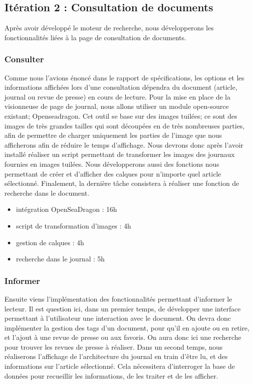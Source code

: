 \subsection{Itération 2 : Consultation de documents}
\label{subsec:consultation}

	Après avoir développé le moteur de recherche, nous développerons les fonctionnalités liées à la page de consultation de documents.

	\subsubsection{Consulter}
	\label{subsubsec:consulter}
		Comme nous l'avions énoncé dans le rapport de spécifications, les options et les informations affichées lors d'une consultation dépendra du document (article, journal ou revue de presse) en cours de lecture.
		Pour la mise en place de la visionneuse de page de journal, nous allons utiliser un module open-source existant; Openseadragon. Cet outil se base sur des images tuilées; ce sont des images de très grandes tailles qui sont découpées en de très nombreuses parties, afin de permettre de charger uniquement les parties de l'image que nous afficherons afin de réduire le temps d'affichage. Nous devrons donc après l'avoir installé réaliser un script permettant de transformer les images des journaux fournies en images tuilées. Nous développerons aussi des fonctions nous permettant de créer et d'afficher des calques pour n'importe quel article sélectionné. Finalement, la dernière tâche consistera à réaliser une fonction de recherche dans le document.

		\begin{itemize}
			\item intégration OpenSeaDragon : 16h
			\item script de transformation d'images : 4h
			\item gestion de calques : 4h
			\item recherche dans le journal : 5h
		\end{itemize}


	\subsubsection{Informer}
	\label{subsubsec:informer}
		Ensuite viens l'implémentation des fonctionnalités permettant d'informer le lecteur. Il est question ici, dans un premier temps, de développer une interface permettant à l'utilisateur une interaction avec le document. On devra donc implémenter la gestion des tags d'un document, pour qu'il en ajoute ou en retire, et l'ajout à une revue de presse ou aux favoris. On aura donc ici une recherche pour trouver les revues de presse à réaliser. Dans un second temps, nous réaliserons l'affichage de l'architecture du journal en train d'être lu, et des informations sur l'article sélectionné. Cela nécessitera d'interroger la base de données pour recueillir les informations, de les traiter et de les afficher.


